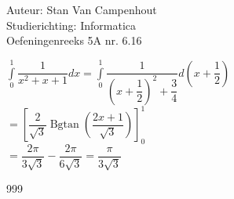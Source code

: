 \documentclass[a4paper]{article}
\begin{document}
  
\noindent \large Auteur: Stan Van Campenhout \\
\noindent \large Studierichting:  Informatica\\
\noindent \large Oefeningenreeks 5A nr. 6.16\\

\medskip

\normalsize

$ \displaystyle\int\limits_0^1\dfrac{1}{x^2+x+1} dx =  \displaystyle\int\limits_0^1\dfrac{1}{\left(x+\dfrac{1}{2}\right)^2+\dfrac{3}{4}} d\left(x+\dfrac{1}{2}\right) $\\

$ = \left[\dfrac{2}{\sqrt{3}}\operatorname{Bgtan}\left(\dfrac{2x+1}{\sqrt{3}}\right)\right]_0^1 $\\

$ = \dfrac{2\pi}{3\sqrt{3}} - \dfrac{2\pi}{6\sqrt{3}} = \dfrac{\pi}{3\sqrt{3}} $\\

\begin{thebibliography}{999}
\end{thebibliography}
\end{document}
